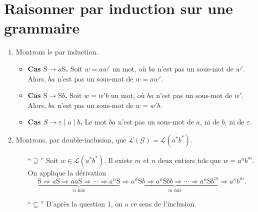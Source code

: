 \section{Raisonner par induction sur une grammaire}

\begin{enumerate}
	\item Montrons le par induction.
		\begin{itemize}
			\item \textbf{Cas $\mathrm{S} \to a \mathrm{S}$.}
				Soit $w = a w'$ un mot, où $ba$ n'est pas un sous-mot de $w'$.
				Alors, $ba$ n'est pas un sous-mot de $w=aw'$.
			\item \textbf{Cas $\mathrm{S} \to \mathrm{S}b$.}
				Soit $w = w' b$ un mot, où $ba$ n'est pas un sous-mot de $w'$.
				Alors, $ba$ n'est pas un sous-mot de $w=w'b$.
			\item \textbf{Cas $S \to \varepsilon  \mid a  \mid b$.}
				Le mot $ba$ n'est pas un sous-mot de $a$, ni de $b$, ni de $\varepsilon$.
		\end{itemize}
	\item Montrons, par double-inclusion, que $\mathcal{L}(\mathcal{G}) = \mathcal{L}(a^* b^*)$.
		\begin{itemize}
			\item[``$\supseteq$'']
				Soit $w \in \mathcal{L}(a^*b^*)$. Il existe $m$ et $n$ deux entiers tels que $w = a^n b^m$.
				On applique la dérivation \[
					\underbrace{\mathrm{S} \Rightarrow a \mathrm{S} \Rightarrow aa \mathrm{S} \Rightarrow \cdots \Rightarrow a^n \mathrm{S}}_{n \text{ fois}} \mathrel{\Rightarrow} \underbrace{a^n \mathrm{S} b \Rightarrow a^n \mathrm{S} bb \Rightarrow \cdots \Rightarrow a^n \mathrm{S} b^m}_{m \text{ fois}} \Rightarrow a^n b^m
				.\]
			\item[``$\subseteq$''] D'après la question 1, on a ce sens de l'inclusion.
		\end{itemize}
\end{enumerate}

